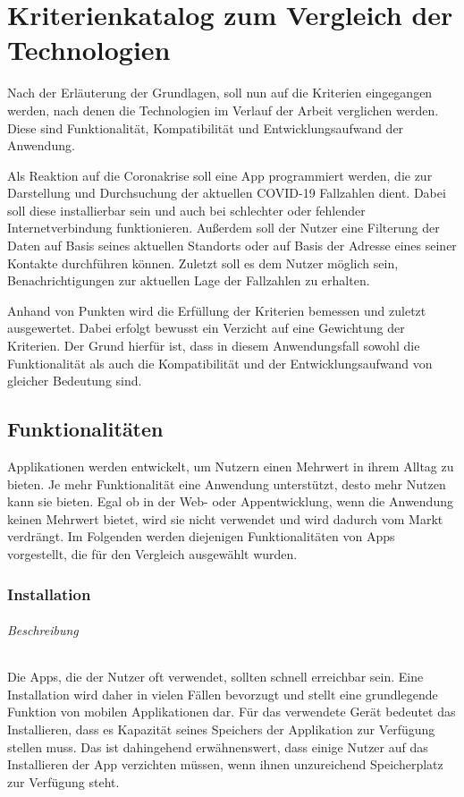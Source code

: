 \chapter{Kriterienkatalog zum Vergleich der Technologien}\label{ch:catalog}
Nach der Erläuterung der Grundlagen, soll nun auf die Kriterien eingegangen werden, nach denen die Technologien im Verlauf der Arbeit verglichen werden.
Diese sind Funktionalität, Kompatibilität und Entwicklungsaufwand der Anwendung.

Als Reaktion auf die Coronakrise soll eine App programmiert werden, die zur Darstellung und Durchsuchung der aktuellen COVID-19 Fallzahlen dient.
Dabei soll diese installierbar sein und auch bei schlechter oder fehlender Internetverbindung funktionieren.
Außerdem soll der Nutzer eine Filterung der Daten auf Basis seines aktuellen Standorts oder auf Basis der Adresse eines seiner Kontakte durchführen können.
Zuletzt soll es dem Nutzer möglich sein, Benachrichtigungen zur aktuellen Lage der Fallzahlen zu erhalten.

Anhand von Punkten wird die Erfüllung der Kriterien bemessen und zuletzt ausgewertet.
Dabei erfolgt bewusst ein Verzicht auf eine Gewichtung der Kriterien.
Der Grund hierfür ist, dass in diesem Anwendungsfall sowohl die Funktionalität als auch die Kompatibilität und der Entwicklungsaufwand von gleicher Bedeutung sind.

\section{Funktionalitäten}
Applikationen werden entwickelt, um Nutzern einen Mehrwert in ihrem Alltag zu bieten.
Je mehr Funktionalität eine Anwendung unterstützt, desto mehr Nutzen kann sie bieten.
Egal ob in der Web- oder Appentwicklung, wenn die Anwendung keinen Mehrwert bietet, wird sie nicht verwendet und wird dadurch vom Markt verdrängt.
Im Folgenden werden diejenigen Funktionalitäten von Apps vorgestellt, die für den Vergleich ausgewählt wurden.

\subsection{Installation}
\subparagraph{Beschreibung\\}
Die Apps, die der Nutzer oft verwendet, sollten schnell erreichbar sein.
Eine Installation wird daher in vielen Fällen bevorzugt und stellt eine grundlegende Funktion von mobilen Applikationen dar.
Für das verwendete Gerät bedeutet das Installieren, dass es Kapazität seines Speichers der Applikation zur Verfügung stellen muss.
Das ist dahingehend erwähnenswert, dass einige Nutzer auf das Installieren der App verzichten müssen, wenn ihnen unzureichend Speicherplatz zur Verfügung steht.

